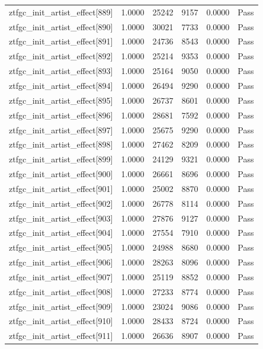 \begin{table}[htbp]
\begin{tabular}{llrrll}
ztfgc\_init\_artist\_effect[889] & 1.0000 & 25242 & 9157 & 0.0000 & Pass \\
ztfgc\_init\_artist\_effect[890] & 1.0000 & 30021 & 7733 & 0.0000 & Pass \\
ztfgc\_init\_artist\_effect[891] & 1.0000 & 24736 & 8543 & 0.0000 & Pass \\
ztfgc\_init\_artist\_effect[892] & 1.0000 & 25214 & 9353 & 0.0000 & Pass \\
ztfgc\_init\_artist\_effect[893] & 1.0000 & 25164 & 9050 & 0.0000 & Pass \\
ztfgc\_init\_artist\_effect[894] & 1.0000 & 26494 & 9290 & 0.0000 & Pass \\
ztfgc\_init\_artist\_effect[895] & 1.0000 & 26737 & 8601 & 0.0000 & Pass \\
ztfgc\_init\_artist\_effect[896] & 1.0000 & 28681 & 7592 & 0.0000 & Pass \\
ztfgc\_init\_artist\_effect[897] & 1.0000 & 25675 & 9290 & 0.0000 & Pass \\
ztfgc\_init\_artist\_effect[898] & 1.0000 & 27462 & 8209 & 0.0000 & Pass \\
ztfgc\_init\_artist\_effect[899] & 1.0000 & 24129 & 9321 & 0.0000 & Pass \\
ztfgc\_init\_artist\_effect[900] & 1.0000 & 26661 & 8696 & 0.0000 & Pass \\
ztfgc\_init\_artist\_effect[901] & 1.0000 & 25002 & 8870 & 0.0000 & Pass \\
ztfgc\_init\_artist\_effect[902] & 1.0000 & 26778 & 8114 & 0.0000 & Pass \\
ztfgc\_init\_artist\_effect[903] & 1.0000 & 27876 & 9127 & 0.0000 & Pass \\
ztfgc\_init\_artist\_effect[904] & 1.0000 & 27554 & 7910 & 0.0000 & Pass \\
ztfgc\_init\_artist\_effect[905] & 1.0000 & 24988 & 8680 & 0.0000 & Pass \\
ztfgc\_init\_artist\_effect[906] & 1.0000 & 28263 & 8096 & 0.0000 & Pass \\
ztfgc\_init\_artist\_effect[907] & 1.0000 & 25119 & 8852 & 0.0000 & Pass \\
ztfgc\_init\_artist\_effect[908] & 1.0000 & 27233 & 8774 & 0.0000 & Pass \\
ztfgc\_init\_artist\_effect[909] & 1.0000 & 23024 & 9086 & 0.0000 & Pass \\
ztfgc\_init\_artist\_effect[910] & 1.0000 & 28433 & 8724 & 0.0000 & Pass \\
ztfgc\_init\_artist\_effect[911] & 1.0000 & 26636 & 8907 & 0.0000 & Pass \\

\end{tabular}
\end{table}
